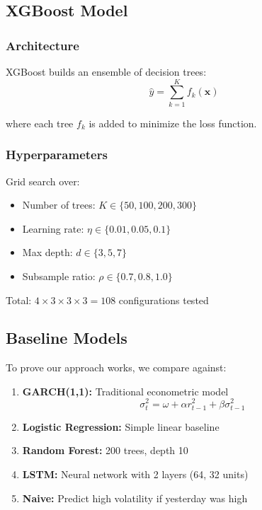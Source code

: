 \documentclass[12pt,a4paper]{article}
\begin{document}
\subsection{XGBoost Model}

\subsubsection{Architecture}

XGBoost builds an ensemble of decision trees:
\begin{equation}
\hat{y} = \sum_{k=1}^{K} f_k(\mathbf{x})
\end{equation}

where each tree $f_k$ is added to minimize the loss function.

\subsubsection{Hyperparameters}

Grid search over:
\begin{itemize}
    \item Number of trees: $K \in \{50, 100, 200, 300\}$
    \item Learning rate: $\eta \in \{0.01, 0.05, 0.1\}$
    \item Max depth: $d \in \{3, 5, 7\}$
    \item Subsample ratio: $\rho \in \{0.7, 0.8, 1.0\}$
\end{itemize}

Total: $4 \times 3 \times 3 \times 3 = 108$ configurations tested

\subsection{Baseline Models}

To prove our approach works, we compare against:

\begin{enumerate}
    \item \textbf{GARCH(1,1):} Traditional econometric model
    \begin{equation}
    \sigma_t^2 = \omega + \alpha r_{t-1}^2 + \beta \sigma_{t-1}^2
    \end{equation}
    
    \item \textbf{Logistic Regression:} Simple linear baseline
    
    \item \textbf{Random Forest:} 200 trees, depth 10
    
    \item \textbf{LSTM:} Neural network with 2 layers (64, 32 units)
    
    \item \textbf{Naive:} Predict high volatility if yesterday was high
\end{enumerate}
\end{document}
